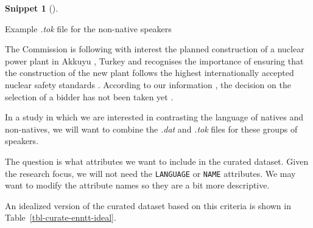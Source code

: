 \documentclass[
  letterpaper,
  krantz1]{latex/krantz-mod}
\newenvironment{Shaded}{\begin{snugshade}}{\end{snugshade}}
\newcommand{\NormalTok}[1]{\textcolor[rgb]{0.00,0.00,0.00}{#1}}
\theoremstyle{definition}
\theoremstyle{definition}
\newtheorem{definition}{Snippet}[chapter]
\theoremstyle{remark}
\begin{document}
\begin{definition}[]\protect\hypertarget{def-curate-enntt-nonnatives-tok}{}\label{def-curate-enntt-nonnatives-tok}

Example \emph{.tok} file for the non-native speakers

\begin{Shaded}
\begin{Highlighting}[]
\NormalTok{The Commission is following with interest the planned construction of a nuclear power plant in Akkuyu , Turkey and recognises the importance of ensuring that the construction of the new plant follows the highest internationally accepted nuclear safety standards .}
\NormalTok{According to our information , the decision on the selection of a bidder has not been taken yet .}
\end{Highlighting}
\end{Shaded}

\end{definition}

In a study in which we are interested in contrasting the language of
natives and non-natives, we will want to combine the \emph{.dat} and
\emph{.tok} files for these groups of speakers.

The question is what attributes we want to include in the curated
dataset. Given the research focus, we will not need the
\texttt{LANGUAGE} or \texttt{NAME} attributes. We may want to modify the
attribute names so they are a bit more descriptive.

An idealized version of the curated dataset based on this criteria is
shown in Table~\ref{tbl-curate-enntt-ideal}.
\end{document}
